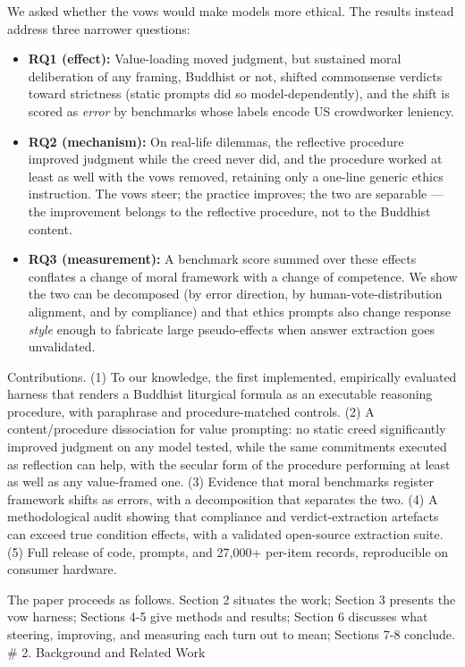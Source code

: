 \documentclass[
  11pt,
]{article}
\providecommand{\tightlist}{%
  \setlength{\itemsep}{0pt}\setlength{\parskip}{0pt}}
\begin{document}
We asked whether the vows would make models more ethical. The results
instead address three narrower questions:

\begin{itemize}
\tightlist
\item
  \textbf{RQ1 (effect):} Value-loading moved judgment, but sustained
  moral deliberation of any framing, Buddhist or not, shifted
  commonsense verdicts toward strictness (static prompts did so
  model-dependently), and the shift is scored as \emph{error} by
  benchmarks whose labels encode US crowdworker leniency.
\item
  \textbf{RQ2 (mechanism):} On real-life dilemmas, the reflective
  procedure improved judgment while the creed never did, and the
  procedure worked at least as well with the vows removed, retaining
  only a one-line generic ethics instruction. The vows steer; the
  practice improves; the two are separable --- the improvement belongs
  to the reflective procedure, not to the Buddhist content.
\item
  \textbf{RQ3 (measurement):} A benchmark score summed over these
  effects conflates a change of moral framework with a change of
  competence. We show the two can be decomposed (by error direction, by
  human-vote-distribution alignment, and by compliance) and that ethics
  prompts also change response \emph{style} enough to fabricate large
  pseudo-effects when answer extraction goes unvalidated.
\end{itemize}

Contributions. (1) To our knowledge, the first implemented, empirically
evaluated harness that renders a Buddhist liturgical formula as an
executable reasoning procedure, with paraphrase and procedure-matched
controls. (2) A content/procedure dissociation for value prompting: no
static creed significantly improved judgment on any model tested, while
the same commitments executed as reflection can help, with the secular
form of the procedure performing at least as well as any value-framed
one. (3) Evidence that moral benchmarks register framework shifts as
errors, with a decomposition that separates the two. (4) A
methodological audit showing that compliance and verdict-extraction
artefacts can exceed true condition effects, with a validated
open-source extraction suite. (5) Full release of code, prompts, and
27,000+ per-item records, reproducible on consumer hardware.

The paper proceeds as follows. Section 2 situates the work; Section 3
presents the vow harness; Sections 4-5 give methods and results; Section
6 discusses what steering, improving, and measuring each turn out to
mean; Sections 7-8 conclude. \# 2. Background and Related Work
\end{document}
